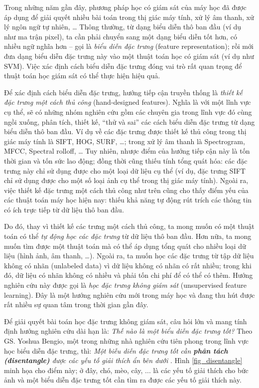  

Trong những năm gần đây, phương pháp học có giám sát của máy học đã được áp dụng để giải quyết nhiều bài toán trong thị giác máy tính, xử lý âm thanh, xử lý ngôn ngữ tự nhiên, … Thông thường, từ dạng biểu diễn thô ban đầu (ví dụ như ma trận pixel), ta cần phải chuyển sang một dạng biểu diễn tốt hơn, có nhiều ngữ nghĩa hơn – gọi là \emph{biểu diễn đặc trưng} (feature representation); rồi mới đưa dạng biểu diễn đặc trưng này vào một thuật toán học có giám sát (ví dụ như SVM). Việc xác định cách biểu diễn đặc trưng đóng vai trò rất quan trọng để thuật toán học giám sát có thể thực hiện hiệu quả. 

Để xác định cách biểu diễn đặc trưng, hướng tiếp cận truyền thống là \emph{thiết kế đặc trưng một cách thủ công} (hand-designed features). Nghĩa là với một lĩnh vực cụ thể, sẽ có những nhóm nghiên cứu gồm các chuyên gia trong lĩnh vực đó cùng ngồi xuống, phân tích, thiết kế, ``thử và sai'' các cách biểu diễn đặc trưng từ dạng biểu diễn thô ban đầu. Ví dụ về các đặc trưng được thiết kế thủ công trong thị giác máy tính là SIFT, HOG, SURF, …; trong xử lý âm thanh là Spectrogram, MFCC, Spectral rolloff, … Tuy nhiên, nhược điểm của hướng tiếp cận này là tốn thời gian và tốn sức lao động; đồng thời cũng thiếu tính tổng quát hóa: các đặc trưng này chỉ sử dụng được cho một loại dữ liệu cụ thể (ví dụ, đặc trưng SIFT chỉ sử dụng được cho một số loại ảnh cụ thể trong thị giác máy tính). Ngoài ra, việc thiết kế đặc trưng một cách thủ công như trên cũng cho thấy điểm yếu của các thuật toán máy học hiện nay: thiếu khả năng tự động rút trích các thông tin có ích trực tiếp từ dữ liệu thô ban đầu.

Do đó, thay vì thiết kế các trưng một cách thủ công, ta mong muốn có một thuật toán có thể \emph{tự động học các đặc trưng} từ dữ liệu thô ban đầu. Hơn nữa, ta mong muốn tìm được một thuật toán mà có thể áp dụng tổng quát cho nhiều loại dữ liệu (hình ảnh, âm thanh, …). Ngoài ra, ta muốn học các đặc trưng từ tập dữ liệu không có nhãn (unlabeled data) vì dữ liệu không có nhãn có rất nhiều; trong khi đó, dữ liệu có nhãn không có nhiều và phải tốn chi phí để có thể có thêm. Hướng nghiên cứu này được gọi là \emph{học đặc trưng không giám sát} (unsupervised feature learning). Đây là một hướng nghiên cứu mới trong máy học và đang thu hút được rất nhiều sự quan tâm trong thời gian gần đây.

Để giải quyết bài toán học đặc trưng không giám sát, câu hỏi lớn và mang tính định hướng nghiên cứu dài hạn là: \emph{Thế nào là một biểu diễn đặc trưng tốt?} Theo GS. Yoshua Bengio, một trong những nhà nghiên cứu tiên phong trong lĩnh vực học biểu diễn đặc trưng, thì: \emph{Một biễu diễn đặc trưng tốt cần \textbf{phân tách (disentangle)} được các yếu tố giải thích ẩn bên dưới} \cite{bengio2013representation}. Hình \ref{fig_disentangle} minh họa cho điểm này; ở đây, chó, mèo, cây, ... là các yếu tố giải thích cho bức ảnh và một biểu diễn đặc trưng tốt cần tìm ra được các yếu tố giải thích này. 

